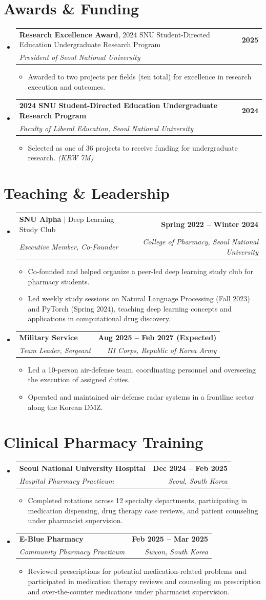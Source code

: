 \documentclass[letterpaper,11pt]{article}
\makeatletter
\newcommand{\resumeItem}[1]{
\item\small{
{#1 \vspace{-2pt}}
}
}
\newcommand{\resumeSubheading}[4]{
\vspace{-2pt}\item
\begin{tabular*}{1.0\textwidth}[t]{l@{\extracolsep{\fill}}r}
\textbf{#1} & \textbf{\small #2} \\
\textit{\small#3} & \textit{\small #4} \\
\end{tabular*}\vspace{-7pt}
}
\newcommand{\resumeSubheadingInline}[5]{
\vspace{-2pt}\item
\begin{tabular*}{1.0\textwidth}[t]{l@{\extracolsep{\fill}}r}
\textbf{#1}, {#2} & \textbf{\small #3} \\
\textit{\small#4} & \textit{\small #5} \\
\end{tabular*}\vspace{-7pt}
}
\newcommand{\resumeSubheadingInlineTwo}[5]{
\vspace{-2pt}\item
\begin{tabular*}{1.0\textwidth}[t]{l@{\extracolsep{\fill}}r}
\textbf{#1} $|$ {#2} & \textbf{\small #3} \\
\textit{\small#4} & \textit{\small #5} \\
\end{tabular*}\vspace{-7pt}
}
\newcommand{\resumeSubHeadingListStart}{\begin{itemize}[leftmargin=0.0in, label={}]}
\newcommand{\resumeSubHeadingListEnd}{\end{itemize}}
\newcommand{\resumeItemListStart}{\begin{itemize}[leftmargin=0.2in]}
\newcommand{\resumeItemListEnd}{\end{itemize}\vspace{-5pt}}
\makeatother
\begin{document}
\begin{itemize}[leftmargin=0.2in, itemsep=2pt, parsep=2pt]
\section{Awards \& Funding}
\resumeSubHeadingListStart
\resumeSubheadingInline{Research Excellence Award}{2024 SNU Student-Directed Education Undergraduate Research Program}{2025}{President of Seoul National University}{}
\resumeItemListStart
\resumeItem{Awarded to two projects per fields (ten total) for excellence in research execution and outcomes.}
\resumeItemListEnd
\resumeSubheading{2024 SNU Student-Directed Education Undergraduate Research Program}{2024}{Faculty of Liberal Education, Seoul National University}{}
\resumeItemListStart
\resumeItem{Selected as one of 36 projects to receive funding for undergraduate research. \textit{(KRW 7M)}}
\resumeItemListEnd
\resumeSubHeadingListEnd


\section{Teaching \& Leadership}
\resumeSubHeadingListStart
\resumeSubheadingInlineTwo{SNU Alpha}{Deep Learning Study Club}{Spring 2022 -- Winter 2024}{Executive Member, Co-Founder}{College of Pharmacy, Seoul National University}
\resumeItemListStart
\resumeItem{Co-founded and helped organize a peer-led deep learning study club for pharmacy students.}
\resumeItem{Led weekly study sessions on Natural Language Processing (Fall 2023) and PyTorch (Spring 2024), teaching deep learning concepts and applications in computational drug discovery.}
\resumeItemListEnd
\resumeSubheading
{Military Service}{Aug 2025 -- Feb 2027 (Expected)}
{Team Leader, Sergeant}{III Corps, Republic of Korea Army}
\resumeItemListStart
\resumeItem{Led a 10-person air-defense team, coordinating personnel and overseeing the execution of assigned duties.}
\resumeItem{Operated and maintained air-defense radar systems in a frontline sector along the Korean DMZ.}
\resumeItemListEnd
\resumeSubHeadingListEnd


\section{Clinical Pharmacy Training}
\resumeSubHeadingListStart
\resumeSubheading
{Seoul National University Hospital}{Dec 2024 -- Feb 2025}
{Hospital Pharmacy Practicum}{Seoul, South Korea}
\resumeItemListStart
\resumeItem{Completed rotations across 12 specialty departments, participating in medication dispensing, drug therapy case reviews, and patient counseling under pharmacist supervision.}
\resumeItemListEnd
\resumeSubheading
{E-Blue Pharmacy}{Feb 2025 -- Mar 2025}
{Community Pharmacy Practicum}{Suwon, South Korea}
\resumeItemListStart
\resumeItem{Reviewed prescriptions for potential medication-related problems and participated in medication therapy reviews and counseling on prescription and over-the-counter medications under pharmacist supervision.}
\resumeItemListEnd
\resumeSubHeadingListEnd



\end{itemize}
\end{document}
